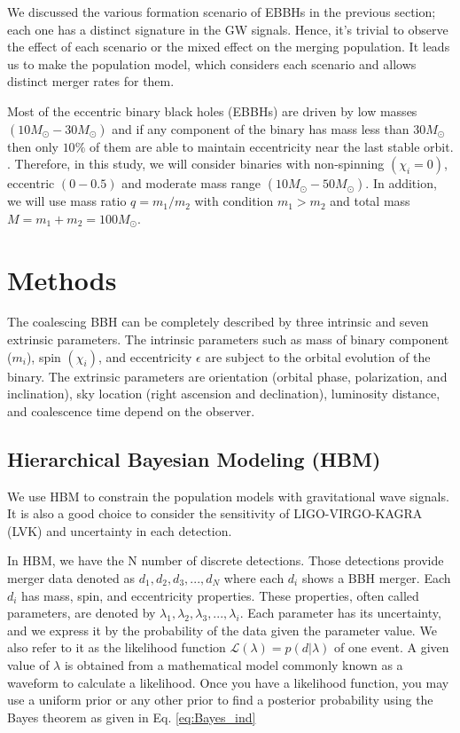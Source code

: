 \documentclass[twocolumn,prd,nofootinbib]{revtex4}
\begin{document}
We discussed the various formation scenario of EBBHs in the previous section; each one has a distinct signature in the GW signals. Hence, it's trivial to observe the effect of each scenario or the mixed effect on the merging population. It leads us to make the population model, which considers each scenario and allows distinct merger rates for them.

Most of the eccentric binary black holes (EBBHs) are driven by low masses $(10M_\odot-30M_\odot)$ and if any component of the binary has mass less than $30 M_\odot$ then only $10\%$ of them are able to maintain eccentricity near the last stable orbit.  \cite{mass_ecc_limit_2018}. Therefore,  in this study, we  will consider binaries with non-spinning $(\chi_i = 0)$, eccentric $(0-0.5)$ and moderate mass range $(10M_\odot-50M_\odot)$. In addition, we will use mass ratio $q=m_1/m_2$ with condition $m_1>m_2$ and total mass $M=m_1+m_2=100M_\odot$.



\section{Methods}
\label{sec:methods}

The coalescing BBH can be completely described by three intrinsic and seven extrinsic parameters. The intrinsic parameters such as mass of binary component ($m_i$), spin $( \chi_i)$, and eccentricity $\epsilon$  are subject to the orbital evolution of the binary. The extrinsic parameters are orientation (orbital phase, polarization, and inclination), sky location (right ascension and declination), luminosity distance, and coalescence time depend on the observer.



\subsection{Hierarchical Bayesian Modeling (HBM)}


We use HBM to constrain the population models with gravitational wave signals. It is also a good choice to consider the sensitivity of LIGO-VIRGO-KAGRA (LVK) and uncertainty in each detection.

In HBM, we have the N number of discrete detections. Those detections provide merger data denoted as $d_1,d_2,d_3,...,d_N$ where each $d_i$ shows a BBH merger. Each $d_i$ has mass, spin, and eccentricity properties. These properties, often called parameters, are denoted by $\lambda_1,\lambda_2,\lambda_3,...,\lambda_i$. Each parameter has its uncertainty, and we express it by the probability of the data given the parameter value. We also refer to it as the likelihood function $\mathcal{L}(\lambda)=p(d|\lambda)$ of one event. A given value of $\lambda$ is obtained from a mathematical model commonly known as a waveform to calculate a likelihood. Once you have a likelihood function, you may use a uniform prior or any other prior to find a posterior probability using the Bayes theorem as given in Eq. \ref{eq:Bayes_ind}
\end{document}
